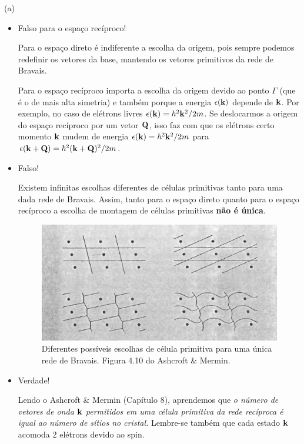 \documentclass[a4paper,10pt]{article}
\begin{document}
(a)
\begin{itemize}
\item Falso para o espaço recíproco!

Para o espaço direto é indiferente a escolha da origem, pois sempre podemos redefinir os vetores da base, mantendo os vetores primitivos da rede de Bravais.

Para o espaço recíproco importa a escolha da origem devido ao ponto $\Gamma$ (que é o de mais alta simetria) e também porque a energia $\epsilon({\vb{k}})$ depende de ${\vb{k}}$. Por exemplo, no caso de elétrons livres $\epsilon({\vb{k}}) = \hbar^2 {\vb{k}}^2 / 2m$. Se deslocarmos a origem do espaço recíproco por um vetor $\vb{Q}$, isso faz com que os elétrons certo momento ${\vb{k}}$ mudem de energia $\epsilon({\vb{k}}) = \hbar^2 {\vb{k}}^2 / 2m$ para $\epsilon({\vb{k}}+\vb{Q}) = \hbar^2 ({\vb{k}}+\vb{Q})^2 / 2m$.

\item Falso!

Existem infinitas escolhas diferentes de células primitivas tanto para uma dada rede de Bravais. Assim, tanto para o espaço direto quanto para o espaço recíproco a escolha de montagem de células primitivas \textbf{não é única}.

\begin{figure}[H]
\centering
\includegraphics[width=\linewidth]{fig/primitive_cells.png}
\caption{Diferentes possíveis escolhas de célula primitiva para uma única rede de Bravais. Figura 4.10 do Ashcroft \& Mermin.}
\label{fig:primitive_cells}
\end{figure}


\item Verdade!

Lendo o Ashcroft \& Mermin (Capítulo 8), aprendemos que \textit{o número de vetores de onda ${\vb{k}}$ permitidos em uma célula primitiva da rede recíproca é igual ao número de sítios no cristal.} Lembre-se também que cada estado ${\vb{k}}$ acomoda 2 elétrons devido ao spin.


\end{itemize}
\end{document}
